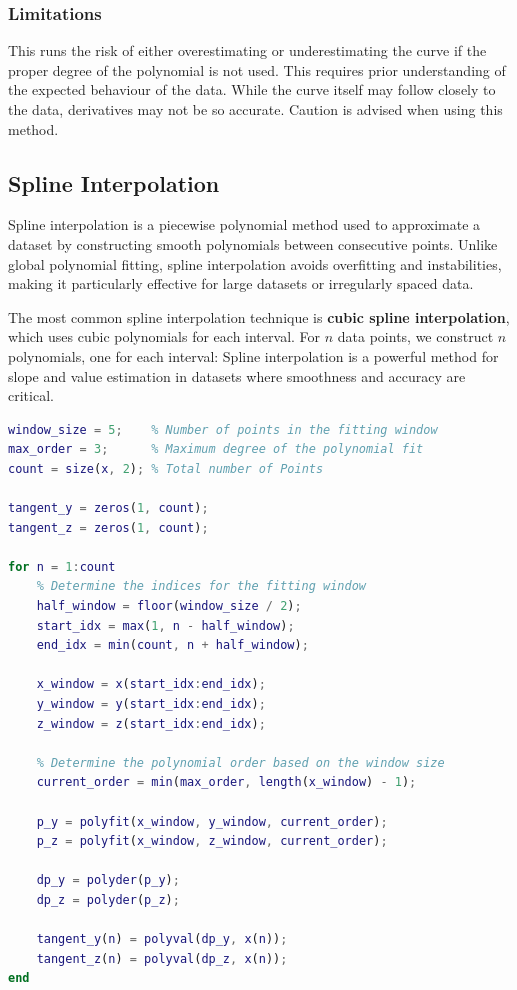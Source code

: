 \documentclass[a4paper]{article}
\begin{document}
\subsubsection{Limitations}
This runs the risk of either overestimating or underestimating the curve if the proper degree of the polynomial is not used. This requires prior understanding of the expected behaviour of the data. While the curve itself may follow closely to the data, derivatives may not be so accurate. Caution is advised when using this method.

\hypertarget{spline-fit}{%
\subsection{Spline Interpolation}\label{Spline}}

Spline interpolation is a piecewise polynomial method used to approximate a dataset by constructing smooth polynomials between consecutive points. Unlike global polynomial fitting, spline interpolation avoids overfitting and instabilities, making it particularly effective for large datasets or irregularly spaced data.

The most common spline interpolation technique is \textbf{cubic spline interpolation}, which uses cubic polynomials for each interval. For $n$ data points, we construct $n$ polynomials, one for each interval: Spline interpolation is a powerful method for slope and value estimation in datasets where smoothness and accuracy are critical.

\begin{lstlisting}[language=matlab]
window_size = 5;    % Number of points in the fitting window
max_order = 3;      % Maximum degree of the polynomial fit
count = size(x, 2); % Total number of Points

tangent_y = zeros(1, count);
tangent_z = zeros(1, count);

for n = 1:count
    % Determine the indices for the fitting window
    half_window = floor(window_size / 2);
    start_idx = max(1, n - half_window);
    end_idx = min(count, n + half_window);
    
    x_window = x(start_idx:end_idx);
    y_window = y(start_idx:end_idx);
    z_window = z(start_idx:end_idx);
    
    % Determine the polynomial order based on the window size
    current_order = min(max_order, length(x_window) - 1);
    
    p_y = polyfit(x_window, y_window, current_order);
    p_z = polyfit(x_window, z_window, current_order);
    
    dp_y = polyder(p_y);
    dp_z = polyder(p_z);
    
    tangent_y(n) = polyval(dp_y, x(n));
    tangent_z(n) = polyval(dp_z, x(n));
end

\end{lstlisting}
\end{document}
